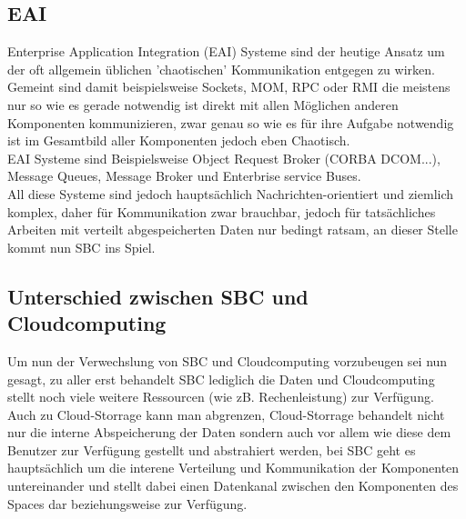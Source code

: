 \documentclass[a4paper,12pt]{scrreprt}
\begin{document}
		\subsection{EAI}
			Enterprise Application Integration (EAI) Systeme sind der heutige Ansatz um der oft allgemein üblichen 'chaotischen' Kommunikation entgegen zu wirken. Gemeint sind damit beispielsweise Sockets, MOM, RPC oder RMI die meistens nur so wie es gerade notwendig ist direkt mit allen Möglichen anderen Komponenten kommunizieren, zwar genau so wie es für ihre Aufgabe notwendig ist im Gesamtbild aller Komponenten jedoch eben Chaotisch. \\
			EAI Systeme sind Beispielsweise Object Request Broker (CORBA DCOM...), Message Queues, Message Broker und Enterbrise service Buses.\\
			All diese Systeme sind jedoch hauptsächlich Nachrichten-orientiert und ziemlich komplex, daher für Kommunikation zwar brauchbar, jedoch für tatsächliches Arbeiten mit verteilt abgespeicherten Daten nur bedingt ratsam, an dieser Stelle kommt nun SBC ins Spiel.
		
		\subsection{Unterschied zwischen SBC und Cloudcomputing}
			Um nun der Verwechslung von SBC und Cloudcomputing vorzubeugen sei nun gesagt, zu aller erst behandelt SBC lediglich die Daten und Cloudcomputing stellt noch viele weitere Ressourcen (wie zB. Rechenleistung) zur Verfügung. Auch zu Cloud-Storrage kann man abgrenzen, Cloud-Storrage behandelt nicht nur die interne Abspeicherung der Daten sondern auch vor allem wie diese dem Benutzer zur Verfügung gestellt und abstrahiert werden, bei SBC geht es hauptsächlich um die interene Verteilung und Kommunikation der Komponenten untereinander und stellt dabei einen Datenkanal zwischen den Komponenten des Spaces dar beziehungsweise zur Verfügung. 
			
\end{document}

